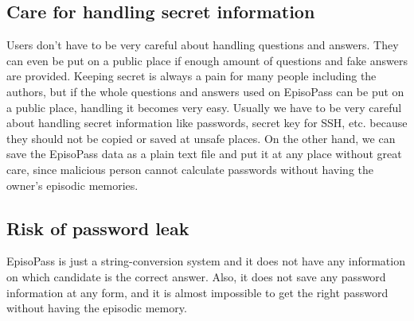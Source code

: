 \documentclass{sigchi}
\begin{document}
%
%


\subsection{Care for handling secret information}

Users don't have to be very careful about handling questions and answers.
They can even be put on a public place
if enough amount of questions and fake answers are provided.
%
Keeping secret is always a pain for many people including
the authors, but if the whole questions and answers used on EpisoPass
can be put on a public place,
handling it becomes very easy.
Usually we have to be very careful about handling
secret information like passwords, secret key for SSH, etc.
because they should not be copied or saved at unsafe places.
On the other hand,
we can save the EpisoPass data as a plain text file and put it at
any place without great care, since malicious person cannot calculate
passwords without having the owner's episodic memories.

\subsection{Risk of password leak}

EpisoPass is just a string-conversion system and it does not
have any information on which candidate is the correct answer.
Also, it does not save any password information at any form, and
it is almost impossible to get the right password 
without having the episodic memory.

\end{document}
